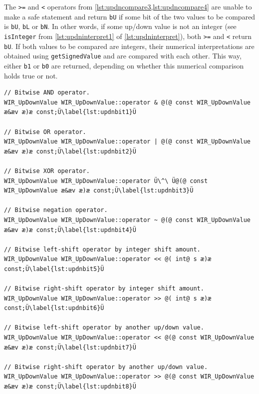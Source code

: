 The \texttt{>=} and \texttt{<} operators from \cref{lst:updncompare3,lst:updncompare4} are unable to make a safe statement and return \texttt{bU} if some bit of the two values to be compared is \texttt{bU}, \texttt{bL} or \texttt{bN}.
In other words, if some up/down value is not an integer (see \texttt{isInteger} from \cref{lst:updninterpret1} of \cref{lst:updninterpret}), both \texttt{>=} and \texttt{<} return \texttt{bU}.
If both values to be compared are integers, their numerical interpretations are obtained using \texttt{getSignedValue} and are compared with each other.
This way, either \texttt{b1} or \texttt{b0} are returned, depending on whether this numerical comparison holds true or not.

\begin{lstlisting}[style=code,float=!t,caption={Bitwise Operators of Class \texttt{WIR\_UpDownValue}},label=lst:updnbit]
// Bitwise AND operator.
WIR_UpDownValue WIR_UpDownValue::operator & @(@ const WIR_UpDownValue æ&æv æ)æ const;Ü\label{lst:updnbit1}Ü

// Bitwise OR operator.
WIR_UpDownValue WIR_UpDownValue::operator | @(@ const WIR_UpDownValue æ&æv æ)æ const;Ü\label{lst:updnbit2}Ü

// Bitwise XOR operator.
WIR_UpDownValue WIR_UpDownValue::operator Ü\^\ Ü@(@ const WIR_UpDownValue æ&æv æ)æ const;Ü\label{lst:updnbit3}Ü

// Bitwise negation operator.
WIR_UpDownValue WIR_UpDownValue::operator ~ @(@ const WIR_UpDownValue æ&æv æ)æ const;Ü\label{lst:updnbit4}Ü

// Bitwise left-shift operator by integer shift amount.
WIR_UpDownValue WIR_UpDownValue::operator << @( int@ s æ)æ const;Ü\label{lst:updnbit5}Ü

// Bitwise right-shift operator by integer shift amount.
WIR_UpDownValue WIR_UpDownValue::operator >> @( int@ s æ)æ const;Ü\label{lst:updnbit6}Ü

// Bitwise left-shift operator by another up/down value.
WIR_UpDownValue WIR_UpDownValue::operator << @(@ const WIR_UpDownValue æ&æv æ)æ const;Ü\label{lst:updnbit7}Ü

// Bitwise right-shift operator by another up/down value.
WIR_UpDownValue WIR_UpDownValue::operator >> @(@ const WIR_UpDownValue æ&æv æ)æ const;Ü\label{lst:updnbit8}Ü
\end{lstlisting}

